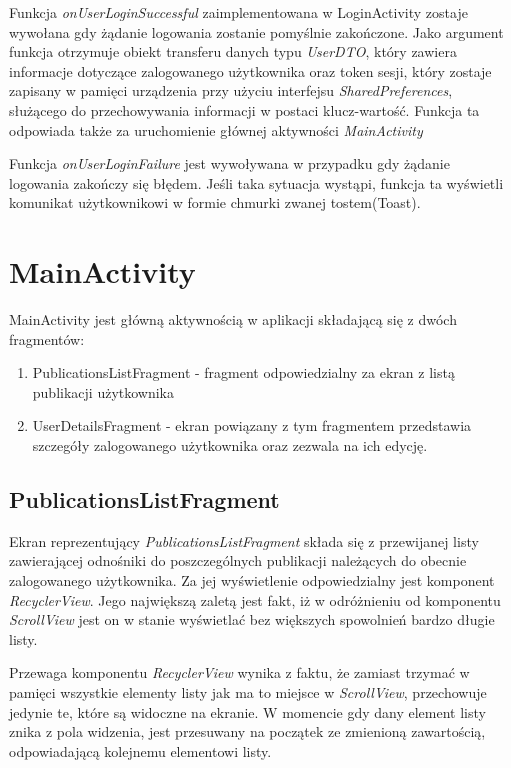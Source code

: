 \documentclass[a4paper,12pt,twoside,openany]{report}
\begin{document}
Funkcja \textit{onUserLoginSuccessful} zaimplementowana w LoginActivity zostaje wywołana gdy żądanie logowania zostanie pomyślnie zakończone. Jako argument funkcja otrzymuje obiekt transferu danych typu \textit{UserDTO}, który zawiera informacje dotyczące zalogowanego użytkownika oraz token sesji, który zostaje zapisany w pamięci urządzenia przy użyciu interfejsu \textit{SharedPreferences}, służącego do przechowywania informacji w postaci klucz-wartość. Funkcja ta odpowiada także za uruchomienie głównej aktywności \textit{MainActivity}

Funkcja \textit{onUserLoginFailure} jest wywoływana w przypadku gdy żądanie logowania zakończy się błędem. Jeśli taka sytuacja wystąpi, funkcja ta wyświetli komunikat użytkownikowi w formie chmurki zwanej tostem(Toast).

\section{MainActivity}
MainActivity jest główną aktywnością w aplikacji składającą się z dwóch fragmentów: 
\begin{enumerate}
	\item PublicationsListFragment - fragment odpowiedzialny za ekran z listą publikacji użytkownika
	\item UserDetailsFragment - ekran powiązany z tym fragmentem przedstawia szczegóły zalogowanego użytkownika oraz zezwala na ich edycję.
\end{enumerate}

\subsection{PublicationsListFragment}
Ekran reprezentujący \textit{PublicationsListFragment} składa się z przewijanej listy zawierającej odnośniki do poszczególnych publikacji należących do obecnie zalogowanego użytkownika. Za jej wyświetlenie odpowiedzialny jest komponent \textit{RecyclerView}. Jego największą zaletą jest fakt, iż w odróżnieniu od komponentu \textit{ScrollView} jest on w stanie wyświetlać bez większych spowolnień bardzo długie listy. 

Przewaga komponentu \textit{RecyclerView} wynika z faktu, że zamiast trzymać w pamięci wszystkie elementy listy jak ma to miejsce w \textit{ScrollView}, przechowuje jedynie te, które są widoczne na ekranie. W momencie gdy dany element listy znika z pola widzenia, jest przesuwany na początek ze zmienioną zawartością, odpowiadającą kolejnemu elementowi listy. 
\end{document}
